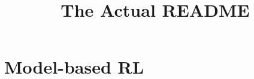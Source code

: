 \documentclass{article}
\title{The Actual README}
\author{}
\date{}
\begin{document}
\maketitle

\tableofcontents

\newpage

\section{Model-based RL}
\end{document}
